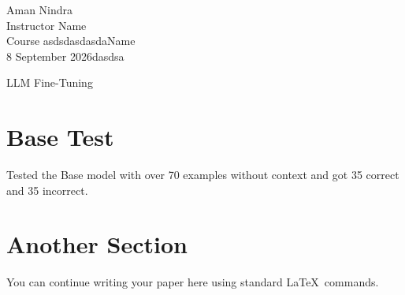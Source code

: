 \documentclass[12pt, letterpaper]{article}
\begin{document}
\noindent
Aman Nindra \\
Instructor Name \\
Course asdsdasdasdaName \\
8 September 2026dasdsa \\

\begin{center}
LLM Fine-Tuning
\end{center}


\noindent



\section{Base Test}

Tested the Base model with over 70 examples without context and got 35 correct and 35 incorrect.

\section{Another Section}

You can continue writing your paper here using standard \LaTeX\ commands.
\end{document}
